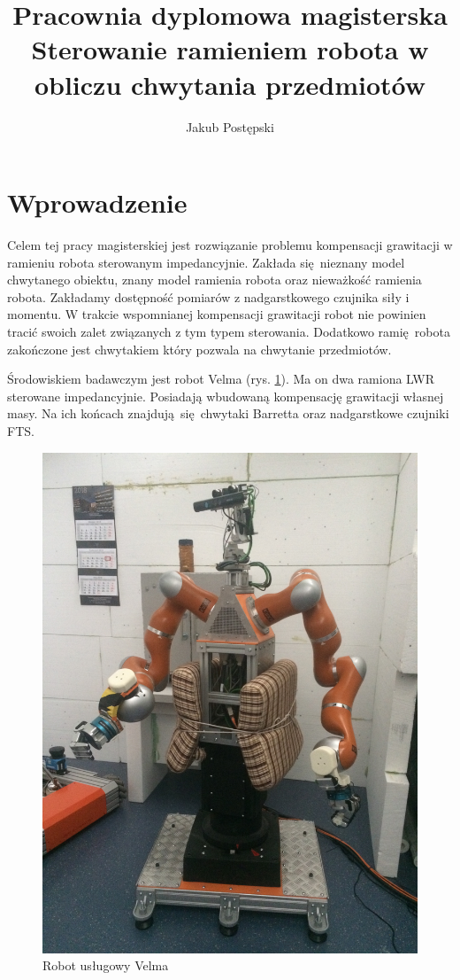 \documentclass[12pt,a4paper]{article}
\begin{document}
	\title{Pracownia dyplomowa magisterska \\ Sterowanie ramieniem robota w obliczu chwytania przedmiotów}
	\author{Jakub Postępski}
	\maketitle
	
	
	\section{Wprowadzenie}
	Celem tej pracy magisterskiej jest rozwiązanie problemu kompensacji grawitacji w ramieniu robota sterowanym impedancyjnie. Zakłada się nieznany model chwytanego obiektu, znany model ramienia robota oraz nieważkość ramienia robota. Zakładamy dostępność pomiarów z nadgarstkowego czujnika siły i momentu. W trakcie wspomnianej kompensacji grawitacji robot nie powinien tracić swoich zalet związanych z tym typem sterowania. Dodatkowo ramię robota zakończone jest chwytakiem który pozwala na chwytanie przedmiotów.
	
	Środowiskiem badawczym jest robot Velma\cite{velma} (rys. \ref{fig:velma}). Ma on dwa ramiona LWR\cite{lwr} sterowane impedancyjnie. Posiadają wbudowaną kompensację grawitacji własnej masy. Na ich końcach znajdują się chwytaki Barretta oraz nadgarstkowe czujniki FTS.
	
	\begin{figure}[H]
		\centering
		\includegraphics[scale=0.05, angle =-90]{velma}
		\caption{Robot usługowy Velma}
		\label{fig:velma}
	\end{figure}
	
\end{document}
